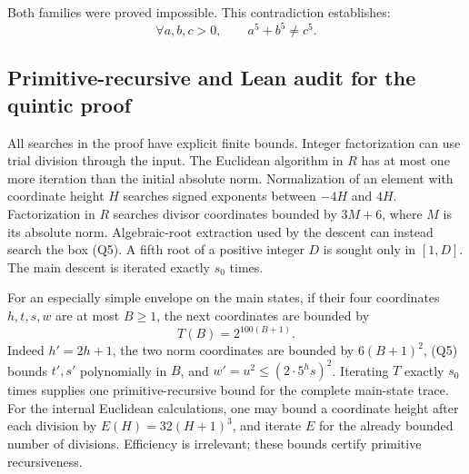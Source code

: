Both families were proved impossible.  This contradiction establishes:
\[
 \boxed{\forall a,b,c>0,\qquad a^5+b^5\ne c^5.}
 \tag{Q22}\label{eq:flt-five}
\]

\subsection{Primitive-recursive and Lean audit for the quintic proof}

All searches in the proof have explicit finite bounds.
Integer factorization can use trial division through the input.
The Euclidean algorithm in \(R\) has at most one more iteration than
the initial absolute norm.  Normalization of an element with coordinate
height \(H\) searches signed exponents between \(-4H\) and \(4H\).
Factorization in \(R\) searches divisor coordinates bounded by \(3M+6\),
where \(M\) is its absolute norm.  Algebraic-root extraction used by
the descent can instead search the box (Q5).
A fifth root of a positive integer \(D\) is sought only in \([1,D]\).
The main descent is iterated exactly \(s_0\) times.

For an especially simple envelope on the main states, if their four
coordinates \(h,t,s,w\) are at most \(B\ge1\), the next coordinates
are bounded by
\[
 T(B)=2^{100(B+1)}.
\]
Indeed \(h'=2h+1\), the two norm coordinates are bounded by
\(6(B+1)^2\), (Q5) bounds \(t',s'\) polynomially in \(B\), and
\(w'=u^2\le(2\cdot5^h s)^2\).
Iterating \(T\) exactly \(s_0\) times supplies one primitive-recursive
bound for the complete main-state trace.
For the internal Euclidean calculations, one may bound a coordinate
height after each division by
\(E(H)=32(H+1)^3\), and iterate \(E\) for the already bounded
number of divisions.  Efficiency is irrelevant; these bounds certify
primitive recursiveness.


